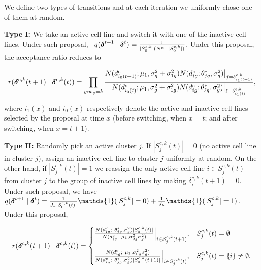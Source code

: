 We define two types of transitions and at each iteration we uniformly chose one of them at random. 

\textbf{Type I:} We take an active cell line and switch it with one of the inactive cell lines. Under such proposal, \ $q(\mbox{\boldmath $\delta$}^{t+1}\mid \mbox{\boldmath $\delta$}^t)=\frac{1}{|S^{c,k}_0|(N^c - |S^{c,k}_0|)}.$ Under this proposal, the acceptance ratio reduces to

$$r(\mbox{\boldmath $\delta$}^{c,k}(t+1) \mid \mbox{\boldmath $\delta$}^{c,k}(t)) = \prod_{g: w_g = k} \frac{N(d^c_{i_0(t+1)}; \mu_1, \sigma^2_g + \sigma^2_{1g})N(d^c_{ig}; \theta^*_{jg}, \sigma^2_g)\big\lvert_{j=\delta^{c,k}_{i_1(t+1)}}}{N(d^c_{i_0(t)}; \mu_1, \sigma^2_g + \sigma^2_{1g})N(d^c_{ig}; \theta^*_{\ell g}, \sigma^2_g)\big\lvert_{\ell=\delta^{c,k}_{i_1(t)}}},$$

\noindent where $i_1(x)$ and $i_0(x)$ respectively denote the active and inactive cell lines selected by the proposal at time $x$ (before switching, when $x=t$; and after switching, when $x=t+1$).

\textbf{Type II:} Randomly pick an active cluster $j$. If $|S^{c,k}_j(t)|=0$ (no active cell line in cluster $j$), assign an inactive cell line to cluster $j$ uniformly at random. On the other hand, if $|S^{c,k}_j(t)|=1$ we reassign the only active cell line $i\in S^{c,k}_j(t)$ from cluster $j$ to the group of inactive cell lines by making $\delta^{c,k}_{i}(t+1)=0$. Under such proposal, we have $q(\bfdelta^{t+1}\mid \bfdelta^t) = \frac{1}{J_k |S^{c,k}_0(t)|}\mathds{1}(|S^{c,k}_j|=0)+\frac{1}{J_k} \mathds{1}(|S^{c,k}_j|=1)$. Under this proposal,

$$r(\bfdelta^{c,k}(t+1) \mid \bfdelta^{c,k}(t)) = 
\begin{cases}
\frac{N(d^c_{ig}; \ \theta^*_{jg}, \sigma^2_g)|S^{c,k}_0(t)|}{N(d^c_{ig}; \ \mu_1, \sigma^2_{0g}\sigma^2_g)}\Big\vert_{i \in S^{c,k}_j(t+1)}, &S^{c,k}_j(t) = \emptyset \vspace{0.3 cm}\\
\frac{N(d^c_{ig}; \ \mu_1, \sigma^2_{0g}\sigma^2_g)}{N(d^c_{ig}; \ \theta^*_{jg}, \sigma^2_g)|S^{c,k}_0(t+1)|}\Big\vert_{i \in S^{c,k}_j(t)}, &S^{c,k}_j(t) = \{i\} \neq \emptyset.
\end{cases}$$

